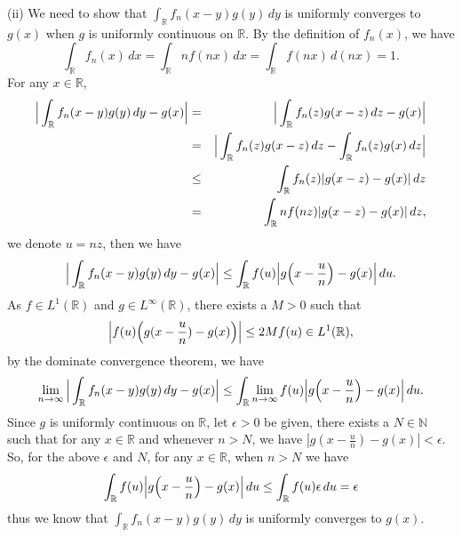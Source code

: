 \documentclass[12pt,a4paper]{ctexart}
\begin{document}
(ii) We need to show that $\int_{\mathbb{R}}^{} f_{n}(x - y) g(y) \, d y$ is uniformly converges to $g(x)$ when $g$ is uniformly continuous on $\mathbb{R}$. By the definition of $f_{n}(x)$, we have
\begin{equation*}
    \int_{\mathbb{R}}^{} f_{n}(x) \, d x = \int_{\mathbb{R}}^{} n f(n x) \, d x = \int_{\mathbb{R}}^{} f(n x) \, d (n x) = 1.
\end{equation*}
For any $x \in \mathbb{R}$,
\begin{eqnarray*}
    \Big{|} \int_{\mathbb{R}}^{} f_{n}(x - y) g(y) \, d y - g(x) \Big{|} & = &  \Big{|} \int_{\mathbb{R}}^{}  f_{n}(z) g(x - z) \, d z - g(x) \Big{|} \\
    & = & \Big{|} \int_{\mathbb{R}}^{}  f_{n}(z) g(x - z) \, d z - \int_{\mathbb{R}}^{}  f_{n}(z) g(x) \, d z \Big{|} \\
    & \leq &  \int_{\mathbb{R}}^{}  f_{n}(z) | g(x - z) - g(x) | \, d z \\
    & = & \int_{\mathbb{R}}^{} n f(n z) | g(x - z) - g(x) | \, d z,
\end{eqnarray*}
we denote $ u = n z$, then we have
\begin{equation*}
    \Big{|} \int_{\mathbb{R}}^{} f_{n}(x - y) g(y) \, d y - g(x) \Big{|} \leq \int_{\mathbb{R}}^{}  f(u) \Big{|} g \Big{(} x - \frac{u}{n} \Big{)} - g(x) \Big{|} \, d u.
\end{equation*}
As $f \in L^{1}(\mathbb{R})$ and $g \in L^{\infty}(\mathbb{R})$, there exists a $M > 0$ such that
\begin{equation*}
    \Big{|} f(u) \Big{(} g(x - \frac{u}{n}) - g(x)\Big{)} \Big{|} \leq 2M f(u) \in L^{1}(\mathbb{R}),
\end{equation*}
by the dominate convergence theorem, we have
\begin{equation*}
    \lim_{n \to \infty} \Big{|} \int_{\mathbb{R}}^{} f_{n}(x - y) g(y) \, d y - g(x) \Big{|} \leq \int_{\mathbb{R}}^{}  \lim_{n \to \infty} f(u) \Big{|} g \Big{(} x - \frac{u}{n} \Big{)} - g(x) \Big{|} \, d u.
\end{equation*}
Since $g$ is uniformly continuous on $\mathbb{R}$, let $\epsilon > 0$ be given, there exists a $N \in \mathbb{N}$ such that for any $x \in \mathbb{R}$ and whenever $n > N$, we have $|g ( x - \frac{u}{n} ) - g(x)| < \epsilon $. So, for the above $\epsilon$ and $N$, for any $x \in \mathbb{R}$, when $n > N$ we have
\begin{equation*}
    \int_{\mathbb{R}}^{} f(u) \Big{|} g \Big{(} x - \frac{u}{n} \Big{)} - g(x) \Big{|} \, d u \leq \int_{\mathbb{R}}^{} f(u) \epsilon \, d u = \epsilon
\end{equation*}
thus we know that $\int_{\mathbb{R}}^{} f_{n}(x - y) g(y) \, d y$ is uniformly converges to $g(x)$.
\end{document}
